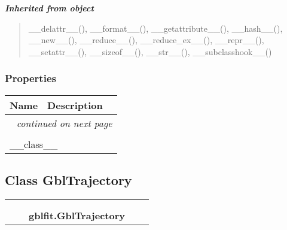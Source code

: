 \large{\textbf{\textit{Inherited from object}}}

\begin{quote}
\_\_delattr\_\_(), \_\_format\_\_(), \_\_getattribute\_\_(), \_\_hash\_\_(), \_\_new\_\_(), \_\_reduce\_\_(), \_\_reduce\_ex\_\_(), \_\_repr\_\_(), \_\_setattr\_\_(), \_\_sizeof\_\_(), \_\_str\_\_(), \_\_subclasshook\_\_()
\end{quote}


  \subsubsection{Properties}

    \vspace{-1cm}
\hspace{\varindent}\begin{longtable}{|p{\varnamewidth}|p{\vardescrwidth}|l}
\cline{1-2}
\cline{1-2} \centering \textbf{Name} & \centering \textbf{Description}& \\
\cline{1-2}
\endhead\cline{1-2}\multicolumn{3}{r}{\small\textit{continued on next page}}\\\endfoot\cline{1-2}
\endlastfoot\multicolumn{2}{|l|}{\textit{Inherited from object}}\\
\multicolumn{2}{|p{\varwidth}|}{\raggedright \_\_class\_\_}\\
\cline{1-2}
\end{longtable}



\subsection{Class GblTrajectory}

    \label{gblfit:GblTrajectory}
\begin{tabular}{cccccc}
\multicolumn{2}{r}{\settowidth{\BCL}{object}\multirow{2}{\BCL}{object}}
&&
  \\\cline{3-3}
  &&\multicolumn{1}{c|}{}
&&
  \\
&&\multicolumn{2}{l}{\textbf{gblfit.GblTrajectory}}
\end{tabular}

